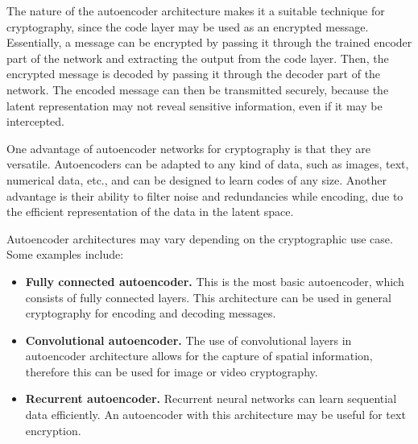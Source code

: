 The nature of the autoencoder architecture makes it a suitable technique for cryptography, since the code layer may be used as an encrypted message. Essentially, a message can be encrypted by passing it through the trained encoder part of the network and extracting the output from the code layer. Then, the encrypted message is decoded by passing it through the decoder part of the network. The encoded message can then be transmitted securely, because the latent representation may not reveal sensitive information, even if it may be intercepted.

One advantage of autoencoder networks for cryptography is that they are versatile. Autoencoders can be adapted to any kind of data, such as images, text, numerical data, etc., and can be designed to learn codes of any size. Another advantage is their ability to filter noise and redundancies while encoding, due to the efficient representation of the data in the latent space.

Autoencoder architectures may vary depending on the cryptographic use case. Some examples include:

\begin{itemize}
    \item \textbf{Fully connected autoencoder.} This is the most basic autoencoder, which consists of fully connected layers. This architecture can be used in general cryptography for encoding and decoding messages.
    \item \textbf{Convolutional autoencoder.} The use of convolutional layers in autoencoder architecture allows for the capture of spatial information, therefore this can be used for image or video cryptography.
    \item \textbf{Recurrent autoencoder.} Recurrent neural networks can learn sequential data efficiently. An autoencoder with this architecture may be useful for text encryption.
\end{itemize}

